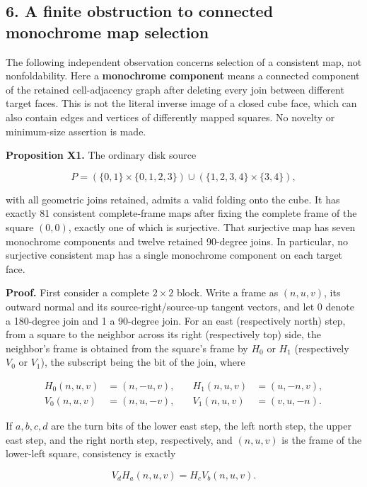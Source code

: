 \documentclass[
  11pt,
]{article}
\begin{document}
\subsection{6. A finite obstruction to connected monochrome map
selection}\label{a-finite-obstruction-to-connected-monochrome-map-selection}

The following independent observation concerns selection of a consistent
map, not nonfoldability. Here a \textbf{monochrome component} means a
connected component of the retained cell-adjacency graph after deleting
every join between different target faces. This is not the literal
inverse image of a closed cube face, which can also contain edges and
vertices of differently mapped squares. No novelty or minimum-size
assertion is made.

\textbf{Proposition X1.} The ordinary disk source

\[
P=(\{0,1\}\times\{0,1,2,3\})\cup(\{1,2,3,4\}\times\{3,4\}),
\]

with all geometric joins retained, admits a valid folding onto the cube.
It has exactly 81 consistent complete-frame maps after fixing the
complete frame of the square \((0,0)\), exactly one of which is
surjective. That surjective map has seven monochrome components and
twelve retained 90-degree joins. In particular, no surjective consistent
map has a single monochrome component on each target face.

\textbf{Proof.} First consider a complete \(2\times2\) block. Write a
frame as \((n,u,v)\), its outward normal and its source-right/source-up
tangent vectors, and let 0 denote a 180-degree join and 1 a 90-degree
join. For an east (respectively north) step, from a square to the
neighbor across its right (respectively top) side, the neighbor's frame
is obtained from the square's frame by \(H_0\) or \(H_1\) (respectively
\(V_0\) or \(V_1\)), the subscript being the bit of the join, where

\[
\begin{aligned}
H_0(n,u,v)&=(n,-u,v), &\quad H_1(n,u,v)&=(u,-n,v),\\
V_0(n,u,v)&=(n,u,-v), &\quad V_1(n,u,v)&=(v,u,-n).
\end{aligned}
\]

If \(a,b,c,d\) are the turn bits of the lower east step, the left north
step, the upper east step, and the right north step, respectively, and
\((n,u,v)\) is the frame of the lower-left square, consistency is
exactly

\[
V_dH_a(n,u,v)=H_cV_b(n,u,v).
\]
\end{document}
